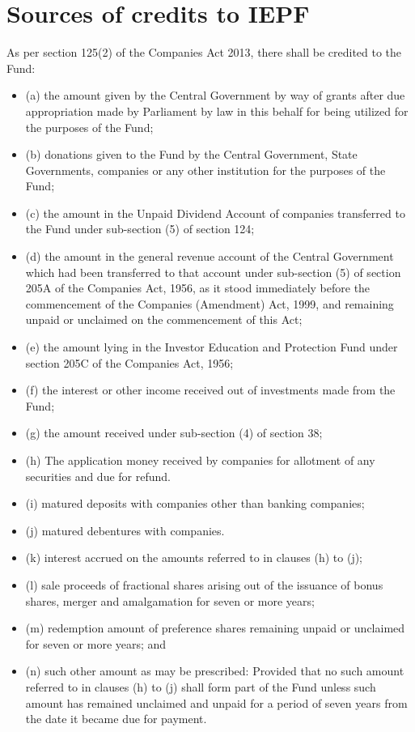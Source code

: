 \documentclass[openany]{book}
\begin{document}
\section{Sources of credits to IEPF}
As per section 125(2) of the Companies Act 2013, there shall be credited to the Fund: 
\begin{itemize}
    \item (a) the amount given by the Central Government by way of grants after due appropriation made by Parliament by law in this behalf for being utilized for the purposes of the Fund;  
    \item (b) donations given to the Fund by the Central Government, State Governments, companies or any other institution for the purposes of the Fund;  
    \item (c) the amount in the Unpaid Dividend Account of companies transferred to the Fund under sub-section (5) of section 124;  
    \item (d) the amount in the general revenue account of the Central Government which had been transferred to that account under sub-section (5) of section 205A of the Companies Act, 1956, as it stood immediately before the commencement of the Companies (Amendment) Act, 1999, and remaining unpaid or unclaimed on the commencement of this Act;  
    \item (e) the amount lying in the Investor Education and Protection Fund under section 205C of the Companies Act, 1956;  
    \item (f) the interest or other income received out of investments made from the Fund;  
    \item (g) the amount received under sub-section (4) of section 38; 
    \item (h) The application money received by companies for allotment of any securities and due for refund.  
    \item (i) matured deposits with companies other than banking companies; 
    \item (j) matured debentures with companies.  
    \item (k) interest accrued on the amounts referred to in clauses (h) to (j);  
    \item (l) sale proceeds of fractional shares arising out of the issuance of bonus shares, merger and amalgamation for seven or more years;  
    \item (m) redemption amount of preference shares remaining unpaid or unclaimed for seven or more years; and  
    \item (n) such other amount as may be prescribed: Provided that no such amount referred to in clauses (h) to (j) shall form part of the Fund unless such amount has remained unclaimed and unpaid for a period of seven years from the date it became due for payment.  
 
\end{itemize}
\end{document}
